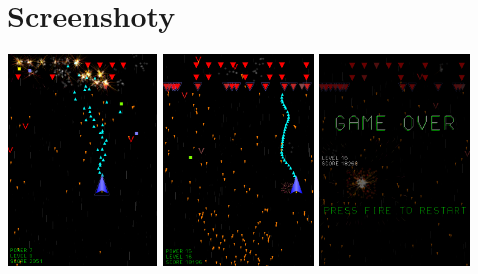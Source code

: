 \documentclass{article}
\begin{document}
\section{Screenshoty}
\includegraphics[width=4cm,height=5.6cm]{combat.png}
\includegraphics[width=4cm,height=5.6cm]{being_hit.png}
\includegraphics[width=4cm,height=5.6cm]{game_over.png}
\end{document}
